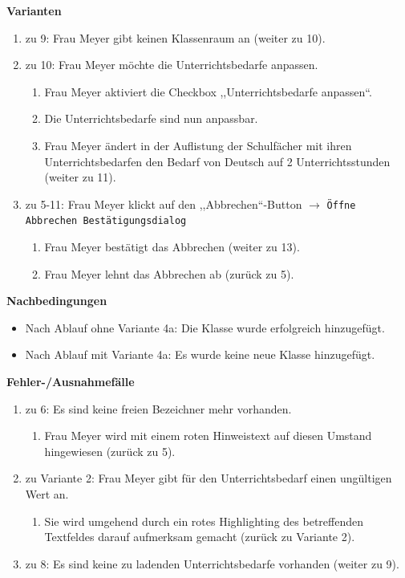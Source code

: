\documentclass[fontsize=12pt,paper=a4,twoside]{scrartcl}
\begin{document}
\textbf{Varianten}
\begin{enumerate}
\item zu 9: Frau Meyer gibt keinen Klassenraum an (weiter zu 10). 
\item zu 10: Frau Meyer möchte die Unterrichtsbedarfe anpassen.
	\begin{enumerate}[label={\arabic*.}]
	\item Frau Meyer aktiviert die Checkbox ,,Unterrichtsbedarfe anpassen``.
	\item Die Unterrichtsbedarfe sind nun anpassbar.
	\item Frau Meyer ändert in der Auflistung der Schulfächer mit ihren Unterrichtsbedarfen den Bedarf von Deutsch auf 2 Unterrichtsstunden (weiter zu 11).
	\end{enumerate}
\item zu 5-11: Frau Meyer klickt auf den ,,Abbrechen``-Button $\rightarrow$ \texttt{Öffne Abbrechen Bestätigungsdialog}
	\begin{enumerate}[label={\alph*.}]
	\item Frau Meyer bestätigt das Abbrechen (weiter zu 13).
	\item Frau Meyer lehnt das Abbrechen ab (zurück zu 5).
	\end{enumerate}
\end{enumerate}
\vspace{5pt}


\textbf{Nachbedingungen}
\begin{itemize}
\item Nach Ablauf ohne Variante 4a: Die Klasse wurde erfolgreich hinzugefügt.
\item Nach Ablauf mit Variante 4a: Es wurde keine neue Klasse hinzugefügt.
\end{itemize}
\vspace{5pt}


\textbf{Fehler-/Ausnahmefälle}
\begin{enumerate}
\item zu 6: Es sind keine freien Bezeichner mehr vorhanden. 
	\begin{enumerate}[label={\arabic*.}]
	\item Frau Meyer wird mit einem roten Hinweistext auf diesen Umstand hingewiesen (zurück zu 5).
	\end{enumerate}
\item zu Variante 2: Frau Meyer gibt für den Unterrichtsbedarf einen ungültigen Wert an.
		\begin{enumerate}[label={\arabic*.}]
		\item Sie wird umgehend durch ein rotes Highlighting des betreffenden Textfeldes darauf aufmerksam gemacht (zurück zu Variante 2).
		\end{enumerate}
\item zu 8: Es sind keine zu ladenden Unterrichtsbedarfe vorhanden (weiter zu 9).

\end{enumerate}
\end{document}
